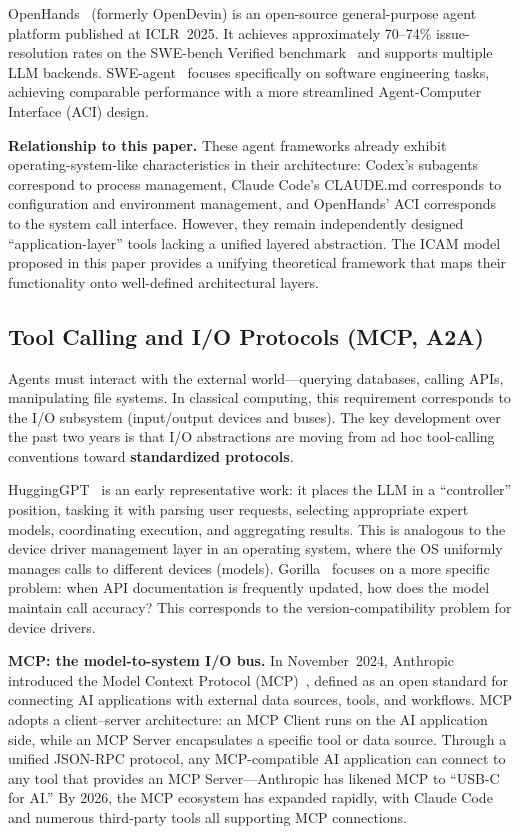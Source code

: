 \documentclass[11pt,a4paper]{article}
\begin{document}
OpenHands~\cite{openhands_paper_2025} (formerly OpenDevin) is an open-source general-purpose agent platform published at ICLR~2025.
It achieves approximately 70--74\% issue-resolution rates on the SWE-bench Verified benchmark~\cite{swebench2023} and supports multiple LLM backends.
SWE-agent~\cite{sweagent2024} focuses specifically on software engineering tasks, achieving comparable performance with a more streamlined Agent-Computer Interface (ACI) design.

\textbf{Relationship to this paper.}
These agent frameworks already exhibit operating-system-like characteristics in their architecture: Codex's subagents correspond to process management, Claude Code's CLAUDE.md corresponds to configuration and environment management, and OpenHands' ACI corresponds to the system call interface.
However, they remain independently designed ``application-layer'' tools lacking a unified layered abstraction.
The ICAM model proposed in this paper provides a unifying theoretical framework that maps their functionality onto well-defined architectural layers.

\subsection{Tool Calling and I/O Protocols (MCP, A2A)}
\label{sec:related-io}

Agents must interact with the external world---querying databases, calling APIs, manipulating file systems.
In classical computing, this requirement corresponds to the I/O subsystem (input/output devices and buses).
The key development over the past two years is that I/O abstractions are moving from ad hoc tool-calling conventions toward \textbf{standardized protocols}.

HuggingGPT~\cite{hugginggpt2023} is an early representative work: it places the LLM in a ``controller'' position, tasking it with parsing user requests, selecting appropriate expert models, coordinating execution, and aggregating results.
This is analogous to the device driver management layer in an operating system, where the OS uniformly manages calls to different devices (models).
Gorilla~\cite{patil2024gorilla} focuses on a more specific problem: when API documentation is frequently updated, how does the model maintain call accuracy? This corresponds to the version-compatibility problem for device drivers.

\textbf{MCP: the model-to-system I/O bus.}
In November~2024, Anthropic introduced the Model Context Protocol (MCP)~\cite{mcp_intro_2026}, defined as an open standard for connecting AI applications with external data sources, tools, and workflows.
MCP adopts a client--server architecture: an MCP Client runs on the AI application side, while an MCP Server encapsulates a specific tool or data source.
Through a unified JSON-RPC protocol, any MCP-compatible AI application can connect to any tool that provides an MCP Server---Anthropic has likened MCP to ``USB-C for AI.''
By 2026, the MCP ecosystem has expanded rapidly, with Claude Code~\cite{anthropic_claudecode_mcp_2026} and numerous third-party tools all supporting MCP connections.
\end{document}

